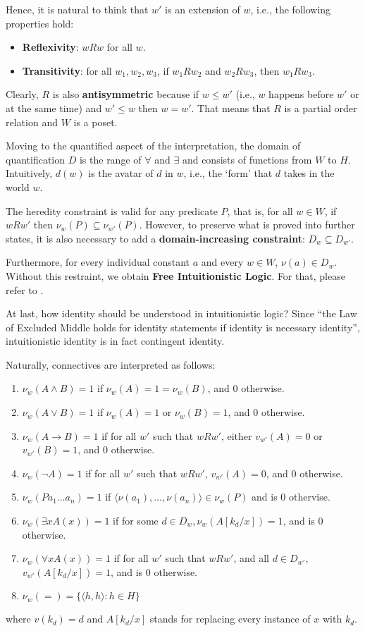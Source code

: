 \documentclass[12pt,a4paper]{article}
\theoremstyle{definition}
\begin{document}
Hence, it is natural to think that $w'$ is an extension of $w$, i.e., the following properties hold:
\begin{itemize}
    \item \textbf{Reflexivity}: $wRw$ for all $w$.
    \item \textbf{Transitivity}: for all $w_1, w_2, w_3$, if $w_1Rw_2$ and $w_2Rw_3$, then $w_1Rw_3$.
\end{itemize}

Clearly, $R$ is also \textbf{antisymmetric} because if $w \leq w'$ (i.e., $w$ happens before $w'$ or at the same time) and $w' \leq w$ then $w = w'$. That means that $R$ is a partial order relation and $W$ is a poset.

Moving to the quantified aspect of the interpretation, the domain of quantification $D$ is the range of $\forall$ and $\exists$ and consists of functions from $W$ to $H$. Intuitively, $d(w)$ is the avatar of $d$ in $w$, i.e., the `form' that $d$ takes in the world $w$.

The heredity constraint is valid for any predicate $P$, that is, for all $w \in W$, if $wRw'$ then $\nu_w(P) \subseteq \nu_{w'}(P)$. However, to preserve what is proved into further states, it is also necessary to add a \textbf{domain-increasing constraint}: $D_w \subseteq D_{w'}$.

Furthermore, for every individual constant $a$ and every $w \in W$, $\nu(a) \in D_w$. Without this restraint, we obtain  \textbf{Free Intuitionistic Logic}. For that, please refer to \cite{priest2008introduction}.

At last, how identity should be understood in intuitionistic logic? Since ``the Law of Excluded Middle holds for identity statements if identity is necessary identity'', intuitionistic identity is in fact contingent identity.

Naturally, connectives are interpreted as follows:
\begin{enumerate}
    \item $\nu_w(A \land B) = 1$ if $\nu_w(A) = 1 = \nu_w(B)$, and $0$ otherwise.
    \item $\nu_w(A \lor B) = 1$ if $\nu_w(A) = 1$ or $\nu_w(B) = 1$, and $0$ otherwise.
    \item $\nu_w(A \to B) = 1$ if for all $w'$ such that $wRw'$, either $v_{w'}(A) = 0$ or $v_{w'}(B) = 1$, and $0$ otherwise.
    \item $\nu_w(\neg A) = 1$ if for all $w'$ such that $wRw'$, $v_{w'}(A) = 0$, and $0$ otherwise.
    \item $\nu_w (Pa_1 \ldots a_n) = 1$ if $\langle \nu(a_1), \ldots, \nu(a_n) \rangle \in \nu_w(P)$ and is $0$ othervise.
    \item $\nu_w(\exists x A(x)) = 1$ if for some $d \in D_w, \nu_w(A[k_d/x])=1$, and is $0$ otherwise.
    \item $\nu_w(\forall x A(x)) = 1$ if for all $w'$ such that $wRw'$, and all $d \in D_{w'}$, $v_{w'}(A[k_d/x])=1$, and is $0$ otherwise.
    \item $\nu_w(=) = \{ \langle h, h \rangle : h \in H \}$
\end{enumerate}
where $v(k_d) = d$ and $A[k_d/x]$ stands for replacing every instance of $x$ with $k_d$.
\end{document}
